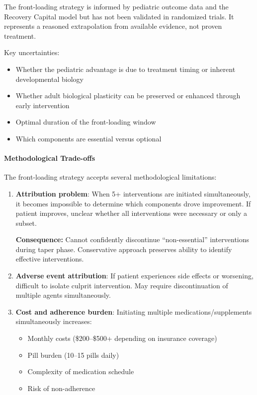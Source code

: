 \begin{warning}
The front-loading strategy is informed by pediatric outcome data and the Recovery Capital model but has not been validated in randomized trials. It represents a reasoned extrapolation from available evidence, not proven treatment.

Key uncertainties:
\begin{itemize}
    \item Whether the pediatric advantage is due to treatment timing or inherent developmental biology
    \item Whether adult biological plasticity can be preserved or enhanced through early intervention
    \item Optimal duration of the front-loading window
    \item Which components are essential versus optional
\end{itemize}

\paragraph{Methodological Trade-offs}

The front-loading strategy accepts several methodological limitations:

\begin{enumerate}
    \item \textbf{Attribution problem}: When 5+ interventions are initiated simultaneously, it becomes impossible to determine which components drove improvement. If patient improves, unclear whether all interventions were necessary or only a subset.

    \textbf{Consequence:} Cannot confidently discontinue ``non-essential'' interventions during taper phase. Conservative approach preserves ability to identify effective interventions.

    \item \textbf{Adverse event attribution}: If patient experiences side effects or worsening, difficult to isolate culprit intervention. May require discontinuation of multiple agents simultaneously.

    \item \textbf{Cost and adherence burden}: Initiating multiple medications/supplements simultaneously increases:
    \begin{itemize}
        \item Monthly costs (\$200--\$500+ depending on insurance coverage)
        \item Pill burden (10--15 pills daily)
        \item Complexity of medication schedule
        \item Risk of non-adherence
    \end{itemize}


\end{enumerate}
\end{warning}
